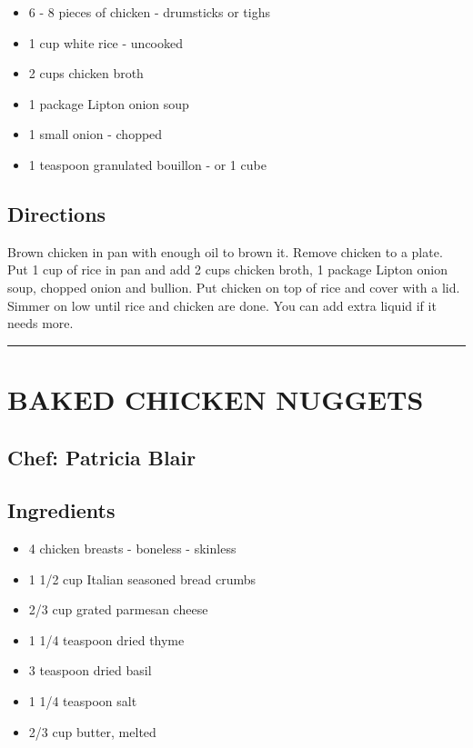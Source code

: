 \documentclass[
]{book}
\providecommand{\tightlist}{%
  \setlength{\itemsep}{0pt}\setlength{\parskip}{0pt}}
\begin{document}
\begin{itemize}
\tightlist
\item
  6 - 8 pieces of chicken - drumsticks or tighs
\item
  1 cup white rice - uncooked
\item
  2 cups chicken broth
\item
  1 package Lipton onion soup
\item
  1 small onion - chopped
\item
  1 teaspoon granulated bouillon - or 1 cube
\end{itemize}

\hypertarget{directions-41}{%
\subsection*{Directions}\label{directions-41}}


Brown chicken in pan with enough oil to brown it. Remove chicken to a plate. Put 1 cup of rice in pan and add 2 cups chicken broth, 1 package Lipton onion soup, chopped onion and bullion. Put chicken on top of rice and cover with a lid. Simmer on low until rice and chicken are done. You can add extra liquid if it needs more.

\begin{center}\rule{0.5\linewidth}{0.5pt}\end{center}

\hypertarget{baked-chicken-nuggets}{%
\section*{BAKED CHICKEN NUGGETS}\label{baked-chicken-nuggets}}


\hypertarget{chef-patricia-blair-9}{%
\subsection*{Chef: Patricia Blair}\label{chef-patricia-blair-9}}


\hypertarget{ingredients-42}{%
\subsection*{Ingredients}\label{ingredients-42}}


\begin{itemize}
\tightlist
\item
  4 chicken breasts - boneless - skinless
\item
  1 1/2 cup Italian seasoned bread crumbs
\item
  2/3 cup grated parmesan cheese
\item
  1 1/4 teaspoon dried thyme
\item
  3 teaspoon dried basil
\item
  1 1/4 teaspoon salt
\item
  2/3 cup butter, melted
\end{itemize}
\end{document}
